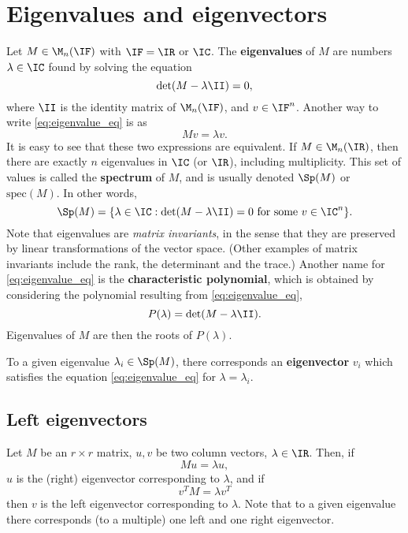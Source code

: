 \section{Eigenvalues and eigenvectors}
\label{app:spectral}
Let $M\in\M_n(\IF)$ with $\IF=\IR$ or $\IC$. The \textbf{eigenvalues} of $M$ are numbers $\lambda\in\IC$ found by solving the equation
\begin{equation}\label{eq:eigenvalue_eq}
\det(M-\lambda\II)=0,
\end{equation}
where $\II$ is the identity matrix of $\M_n(\IF)$, and $v\in\IF^n$. Another way to write \eqref{eq:eigenvalue_eq} is as
\[
Mv=\lambda v.
\]
It is easy to see that these two expressions are equivalent. If $M\in\M_n(\IR)$, then there are exactly $n$ eigenvalues in $\IC$ (or $\IR$), including multiplicity. This set of values is called the \textbf{spectrum} of $M$, and is usually denoted $\Sp(M)$ or $\textrm{spec}(M)$. In other words,
\[
\Sp(M)=\{\lambda\in\IC:\det(M-\lambda\II)=0\textrm{ for some }v\in\IC^n\}.
\]
Note that eigenvalues are \emph{matrix invariants}, in the sense that they are preserved by linear transformations of the vector space. (Other examples of matrix invariants include the rank, the determinant and the trace.)
Another name for \eqref{eq:eigenvalue_eq} is the \textbf{characteristic polynomial}, which is obtained by considering the polynomial resulting from \eqref{eq:eigenvalue_eq},
\[
P(\lambda)=\det(M-\lambda\II).
\]
Eigenvalues of $M$ are then the roots of $P(\lambda)$.

To a given eigenvalue $\lambda_i\in\Sp(M)$, there corresponds an \textbf{eigenvector} $v_i$ which satisfies the equation \eqref{eq:eigenvalue_eq} for $\lambda=\lambda_i$.


\subsection{Left eigenvectors}
Let $M$ be an $r\times r$ matrix, $u,v$ be two column vectors, $\lambda\in\IR$. Then, if  
\[
Mu=\lambda u,
\]
$u$ is the (right) eigenvector corresponding to $\lambda$, and if
\[
v^TM=\lambda v^T
\]
then $v$ is the left eigenvector corresponding to $\lambda$. Note that to a given eigenvalue there corresponds (to a multiple) one left and one right eigenvector.


